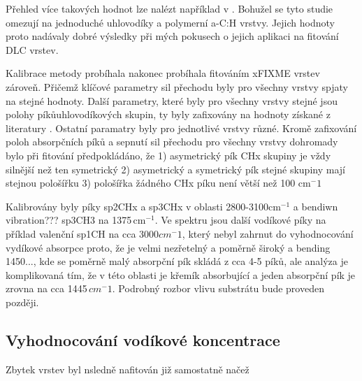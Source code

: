 Přehled více takových hodnot lze nalézt například v \cite{heitz1998}. Bohužel se tyto studie omezují na jednoduché uhlovodíky a polymerní a-C:H vrstvy. Jejich hodnoty proto nadávaly dobré výsledky při mých pokusech o jejich aplikaci na fitování DLC vrstev. 

Kalibrace metody probíhala nakonec probíhala fitováním xFIXME vrstev zároveň. Přičemž klíčové parametry sil přechodu byly pro všechny vrstvy spjaty na stejné hodnoty. Další parametry, které byly pro všechny vrstvy stejné jsou polohy píkůuhlovodíkových skupin, ty byly zafixovány na hodnoty získané z literatury \cite{Robertson2002, Dischler1983, Ristein1998, Zajickova2011}. Ostatní paramatry byly pro jednotlivé vrstvy různé.
Kromě zafixování poloh absorpčních píků a sepnutí sil přechodu pro všechny vrstvy dohromady bylo při fitování předpokládáno, že 
1) asymetrický pík CHx skupiny je vždy silnější než ten symetrický
2) asymetrický a symetrický pík stejné skupiny mají stejnou pološířku
3) pološířka žádného CHx píku není větší než 100 cm$^-1$

Kalibrovány byly píky sp2CHx a sp3CHx v oblasti 2800-3100cm$^{-1}$ a bendiwn vibration??? sp3CH3 na 1375\,cm$^{-1}$. Ve spektru jsou další vodíkové píky na příklad valenční sp1CH na cca 3000$cm^-1$, který nebyl zahrnut do vyhodnocování vydíkové absorpce proto, že je velmi nezřetelný a poměrně široký a bending 1450..., kde se poměrně malý absorpční pík skládá z cca 4-5 píků, ale analýza je komplikovaná tím, že v této oblasti je křemík absorbující a jeden absorpční pík je zrovna na cca 1445\,$cm^-1$. Podrobný rozbor vlivu substrátu bude proveden později.

\subsection{Vyhodnocování vodíkové koncentrace}
Zbytek vrstev byl nsledně nafitován již samostatně načež 







\cleardoublepage
